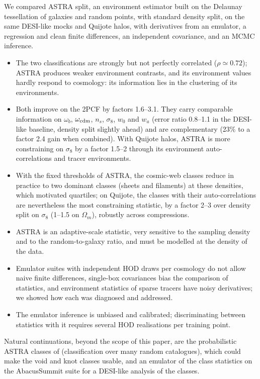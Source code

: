 \documentclass[11pt,twocolumn]{article}
\begin{document}
We compared ASTRA split, an environment estimator built on the Delaunay tessellation of galaxies and random points, with standard density split, on the same DESI-like mocks and Quijote halos, with derivatives from an emulator, a regression and clean finite differences, an independent covariance, and an MCMC inference.
\begin{itemize}
\item The two classifications are strongly but not perfectly correlated ($\rho\simeq0.72$); ASTRA produces weaker environment contrasts, and its environment values hardly respond to cosmology: its information lies in the clustering of its environments.
\item Both improve on the 2PCF by factors 1.6--3.1. They carry comparable information on $\omega_b$, $\omega_{\rm cdm}$, $n_s$, $\sigma_8$, $w_0$ and $w_a$ (error ratio 0.8--1.1 in the DESI-like baseline, density split slightly ahead) and are complementary (23\% to a factor 2.4 gain when combined). With Quijote halos, ASTRA is more constraining on $\sigma_8$ by a factor 1.5--2 through its environment auto-correlations and tracer environments.
\item With the fixed thresholds of ASTRA, the cosmic-web classes reduce in practice to two dominant classes (sheets and filaments) at these densities, which motivated quartiles; on Quijote, the classes with their auto-correlations are nevertheless the most constraining statistic, by a factor 2--3 over density split on $\sigma_8$ (1--1.5 on $\Omega_m$), robustly across compressions.
\item ASTRA is an adaptive-scale statistic, very sensitive to the sampling density and to the random-to-galaxy ratio, and must be modelled at the density of the data.
\item Emulator suites with independent HOD draws per cosmology do not allow naive finite differences, single-box covariances bias the comparison of statistics, and environment statistics of sparse tracers have noisy derivatives; we showed how each was diagnosed and addressed.
\item The emulator inference is unbiased and calibrated; discriminating between statistics with it requires several HOD realisations per training point.
\end{itemize}
Natural continuations, beyond the scope of this paper, are the probabilistic ASTRA classes of \cite{ASTRA} (classification over many random catalogues), which could make the void and knot classes usable, and an emulator of the class statistics on the AbacusSummit suite for a DESI-like analysis of the classes.
\end{document}
